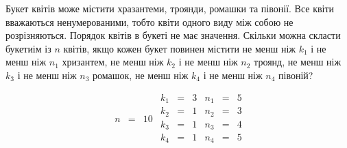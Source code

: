 \begin{center}\large{}\end{center}

Букет квітів може містити хразантеми, троянди, ромашки та півонії. Все квіти вважаються ненумерованими, тобто квіти одного виду між собою не розрізняються. Порядок квітів в букеті не має значення. Скільки можна скласти букетиім із $n$ квітів, якщо кожен букет повинен містити не менш ніж $k_1$ і не менш ніж $n_1$ хризантем, не менш ніж $k_2$ і не менш ніж $n_2$ троянд, не менш ніж $k_3$ і не менш ніж $n_3$ ромашок, не менш ніж $k_4$ і не менш ніж $n_4$ півоній?

$$
  \begin{array}{ lcr  }
    n &=& 10 \\
  \end{array}
  \begin{array}{ lcr }
    k_1 &=& 3 \\
    k_2 &=& 1 \\
    k_3 &=& 1 \\
    k_4 &=& 1 \\
  \end{array}
  \begin{array}{ lcr  }
    n_1 &=& 5 \\
    n_2 &=& 3 \\
    n_3 &=& 4 \\
    n_4 &=& 5 \\
  \end{array}
$$
